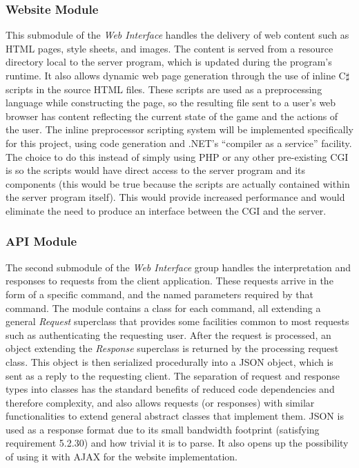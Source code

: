 \subsubsection{Website Module}
This submodule of the \emph{Web Interface} handles the delivery of web content such as HTML pages, style sheets, and images. The content is served from a resource directory local to the server program, which is updated during the program's runtime. It also allows dynamic web page generation through the use of inline C$\sharp$ scripts in the source HTML files. These scripts are used as a preprocessing language while constructing the page, so the resulting file sent to a user's web browser has content reflecting the current state of the game and the actions of the user. The inline preprocessor scripting system will be implemented specifically for this project, using code generation and .NET's ``compiler as a service'' facility. The choice to do this instead of simply using PHP or any other pre-existing CGI is so the scripts would have direct access to the server program and its components (this would be true because the scripts are actually contained within the server program itself). This would provide increased performance and would eliminate the need to produce an interface between the CGI and the server.

\subsubsection{API Module}
The second submodule of the \emph{Web Interface} group handles the interpretation and responses to requests from the client application. These requests arrive in the form of a specific command, and the named parameters required by that command. The module contains a class for each command, all extending a general \emph{Request} superclass that provides some facilities common to most requests such as authenticating the requesting user. After the request is processed, an object extending the \emph{Response} superclass is returned by the processing request class. This object is then serialized procedurally into a JSON object, which is sent as a reply to the requesting client. The separation of request and response types into classes has the standard benefits of reduced code dependencies and therefore complexity, and also allows requests (or responses) with similar functionalities to extend general abstract classes that implement them. JSON is used as a response format due to its small bandwidth footprint (satisfying requirement 5.2.30) and how trivial it is to parse. It also opens up the possibility of using it with AJAX for the website implementation.

